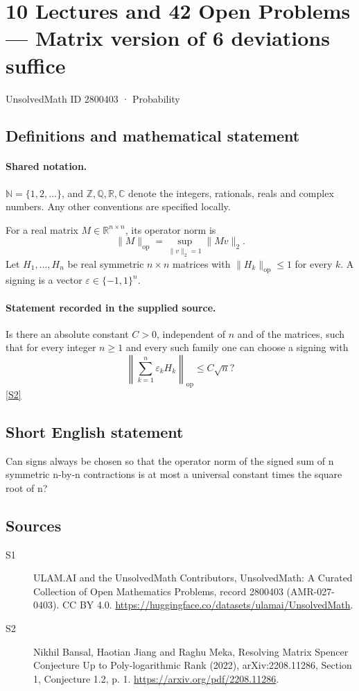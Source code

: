 \documentclass[11pt]{article}
\newcommand{\sref}[2]{\hyperlink{source:#1:#2}{[S#2]}}
\begin{document}
\setcounter{section}{2800402}
\section{10 Lectures and 42 Open Problems — Matrix version of 6 deviations suffice}\label{2800403}
{\small\sffamily UnsolvedMath ID 2800403 · Probability}
\subsection{Definitions and mathematical statement}

\paragraph{Shared notation.}$\mathbb N=\{1,2,\ldots\}$, and $\mathbb Z,\mathbb Q,\mathbb R,\mathbb C$ denote the integers, rationals, reals and complex numbers. Any other conventions are specified locally.


For a real matrix \(M\in\mathbb R^{n\times n}\), its operator norm is
\[\|M\|_{\mathrm{op}}=\sup_{\|v\|_2=1}\|Mv\|_2.\]
Let \(H_1,\ldots,H_n\) be real symmetric \(n\times n\) matrices with \(\|H_k\|_{\mathrm{op}}\le1\) for every \(k\). A signing is a vector \(\varepsilon\in\{-1,1\}^n\).
\paragraph{Statement recorded in the supplied source.}
Is there an absolute constant \(C>0\), independent of \(n\) and of the matrices, such that for every integer \(n\ge1\) and every such family one can choose a signing with
\[\left\|\sum_{k=1}^n\varepsilon_k H_k\right\|_{\mathrm{op}}\le C\sqrt n?\] \sref{2800403}{2}
\subsection{Short English statement}
Can signs always be chosen so that the operator norm of the signed sum of n symmetric n-by-n contractions is at most a universal constant times the square root of n?
\subsection{Sources}
\begin{description}
\item[\hypertarget{source:2800403:1}{S1}] ULAM.AI and the UnsolvedMath Contributors, UnsolvedMath: A Curated Collection of Open Mathematics Problems, record 2800403 (AMR-027-0403). CC BY 4.0. \url{https://huggingface.co/datasets/ulamai/UnsolvedMath}.
\item[\hypertarget{source:2800403:2}{S2}] Nikhil Bansal, Haotian Jiang and Raghu Meka, Resolving Matrix Spencer Conjecture Up to Poly-logarithmic Rank (2022), arXiv:2208.11286, Section 1, Conjecture 1.2, p. 1. \url{https://arxiv.org/pdf/2208.11286}.
\end{description}
\label{end:2800403}
\end{document}
